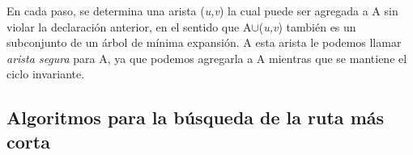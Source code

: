 \documentclass[a4paper, 11pt]{report}
\begin{document}
En cada paso, se determina una arista (\textit{u,v}) la cual puede ser agregada a A sin violar la declaración anterior, en el sentido que A$\cup${(\textit{u,v})} también es un subconjunto de un árbol de mínima expansión. A esta arista le podemos llamar \textit{arista segura} para A, ya que podemos agregarla a A mientras que se mantiene el ciclo invariante.





\newpage
\subsection{Algoritmos para la b\'usqueda de la ruta m\'as corta}
\end{document}
